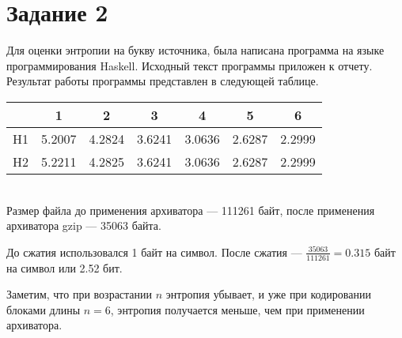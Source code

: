 \section{Задание 2}
Для оценки энтропии на букву источника, была написана программа на языке программирования Haskell.
Исходный текст программы приложен к отчету.
Результат работы программы представлен в следующей таблице.

\begin{tabular}{|c|c|c|c|c|c|c|}
\hline
   & 1 & 2 & 3 & 4 & 5 & 6\\
\hline
H1 & 5.2007 & 4.2824 & 3.6241 & 3.0636 & 2.6287 & 2.2999\\
\hline
H2 & 5.2211 & 4.2825 &  3.6241 & 3.0636 & 2.6287 & 2.2999\\
\hline
\end{tabular}
\\


Размер файла до применения архиватора {---} 111261 байт, после применения архиватора gzip {---} 35063 байта. 

До сжатия использовался 1 байт на символ. После сжатия {---} $\frac{35063}{111261} = 0.315$ байт на символ или  2.52 бит. 

Заметим, что при возрастании $n$ энтропия убывает, и уже при кодировании блоками длины $n = 6$, энтропия получается меньше, чем при применении архиватора.